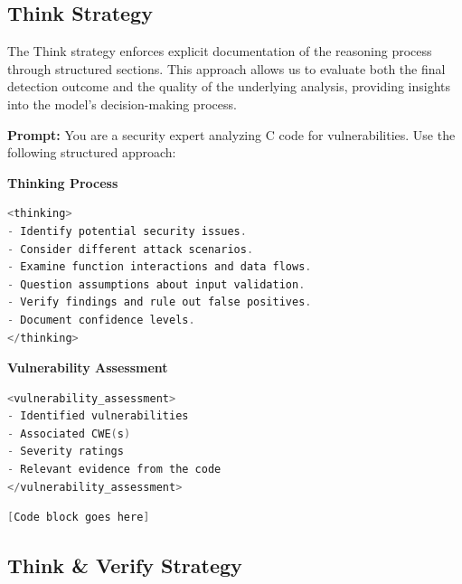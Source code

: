 \documentclass[sigconf]{acmart}
\begin{document}
\subsection{Think Strategy}
The Think strategy enforces explicit documentation of the reasoning process through structured sections. This approach allows us to evaluate both the final detection outcome and the quality of the underlying analysis, providing insights into the model's decision-making process.
\begin{tcolorbox}[colback=greenbox, colframe=green!60!black, 
title=\textbf{Think Strategy}, 
sharp corners=south, boxrule=1pt, width=\linewidth]
\textbf{Prompt:}  
You are a security expert analyzing C code for vulnerabilities. Use the following structured approach:

\textbf{Thinking Process}
\begin{lstlisting}[language=C, 
                  backgroundcolor=\color{codebg},
                  basicstyle=\footnotesize\ttfamily,
                  breaklines=true,
                  frame=none]
<thinking>
- Identify potential security issues.
- Consider different attack scenarios.
- Examine function interactions and data flows.
- Question assumptions about input validation.
- Verify findings and rule out false positives.
- Document confidence levels.
</thinking>
\end{lstlisting}

\textbf{Vulnerability Assessment}
\begin{lstlisting}[language=C, 
                  backgroundcolor=\color{codebg},
                  basicstyle=\footnotesize\ttfamily,
                  breaklines=true,
                  frame=none]
<vulnerability_assessment>
- Identified vulnerabilities
- Associated CWE(s)
- Severity ratings
- Relevant evidence from the code
</vulnerability_assessment>
\end{lstlisting}

\begin{lstlisting}[language=C, 
                  backgroundcolor=\color{codebg},
                  basicstyle=\footnotesize\ttfamily,
                  breaklines=true,
                  frame=none]
[Code block goes here]
\end{lstlisting}
\end{tcolorbox}

\subsection{Think \& Verify Strategy}
\end{document}
